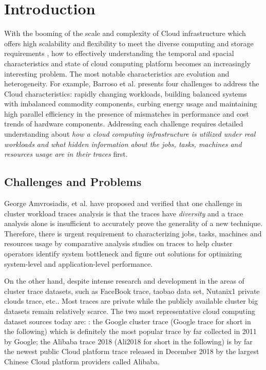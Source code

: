 \documentclass[conference]{IEEEtran}
\begin{document}
\section{Introduction}
With the booming of the scale and complexity of Cloud infrastructure which offers high scalability and flexibility to meet the diverse computing and storage requirements \cite{George2018Diversity}, how to effectively understanding the temporal and spacial characteristics and  state of cloud computing platform becomes an increasingly interesting problem. The most notable characteristics are evolution and heterogeneity. For example, Barroso et al. \cite{Baroso2009CloudChallenges} presents four challenges to address the Cloud  characteristics: rapidly changing workloads, building balanced systems with imbalanced commodity components,
curbing energy usage and maintaining high parallel efficiency in the presence of mismatches in performance and cost trends of hardware components. Addressing each challenge requires
detailed understanding about \emph{how a cloud computing infrastructure
is utilized under real workloads and what hidden information about the jobs, tasks, machines and resources usage are  in their traces} first.
\subsection{Challenges and Problems}
George Amvrosiadis, et al.\cite{George2018Diversity} have proposed and
verified that one challenge in cluster workload traces analysis is that the traces have \emph{diversity} and a trace analysis alone is insufficient to accurately
prove the generality of a new technique. Therefore, there is urgent  requirement to characterizing jobs, tasks, machines and resources usage by  comparative analysis studies on traces to help cluster operators identify system bottleneck and figure out solutions for optimizing system-level and application-level performance.

On the other hand,  despite intense research and development in the areas of cluster trace datasets, such as FaceBook trace\cite{FacebookTrace}, taobao data set\cite{Ren2014WorkloadTaobao}, Nutanix1 private clouds trace\cite{cano2016characterizing}, etc.. Most traces are private while the publicly available cluster  big datasets remain relatively scarce\cite{George2018Diversity}. The two most representative  cloud computing dataset sources today are: : the Google cluster trace (Google trace for short in the following) \cite{GoogleTraceWeb} which is definitely the most popular trace by far\cite{George2018Diversity} collected in 2011 by Google; the Alibaba trace 2018 (Ali2018 for short in the following) \cite{AlibabaTraceWeb}  is by far the newest public Cloud platform trace released in December 2018 by the largest Chinese  Cloud platform providers called Alibaba.
\end{document}
